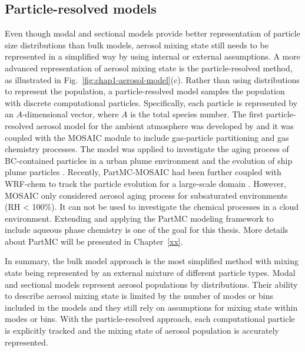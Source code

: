 \documentclass[edeposit,fullpage]{uiucthesis2009}
\begin{document}
\subsection{Particle-resolved models}
Even though modal and sectional models provide better representation
of particle size distributions than bulk models, aerosol mixing state
still needs to be represented in a simplified way by using internal or
external assumptions. A more advanced representation of aerosol mixing
state is the particle-resolved method, as illustrated in
Fig.~\ref{fig:chap1-aerosol-model}(c). Rather than using distributions
to represent the population, a particle-resolved model samples the
population with discrete computational particles. Specifically, each
particle is represented by an $A$-dimensional vector, where $A$ is the
total species number. The first particle-resolved aerosol model for
the ambient atmosphere was developed by \citet{Riemer2009} and it was
coupled with the MOSAIC module to include gas-particle partitioning
and gas chemistry processes. The model was applied to investigate the
aging process of BC-contained particles in a urban plume environment
and the evolution of ship plume particles \citep{tian2014modeling,
  Ching2016}. Recently, PartMC-MOSAIC had been further coupled with
WRF-chem to track the particle evolution for a large-scale domain
\citep{curtis2017single}. However, MOSAIC only considered aerosol
aging process for subsaturated environments (RH < 100\%). It can not
be used to investigate the chemical processes in a cloud
environment. Extending and applying the PartMC modeling framework to
include aqueous phase chemistry is one of the goal for this
thesis. More details about PartMC will be presented in
Chapter~\ref{xx}.

In summary, the bulk model approach is the most simplified method with
mixing state being represented by an external mixture of different
particle types. Modal and sectional models represent aerosol
populations by distributions. Their ability to describe aerosol mixing
state is limited by the number of modes or bins included in the models
and they still rely on assumptions for mixing state within modes or
bins. With the particle-resolved approach, each computational particle
is explicitly tracked and the mixing state of aerosol population is
accurately represented.
\end{document}
